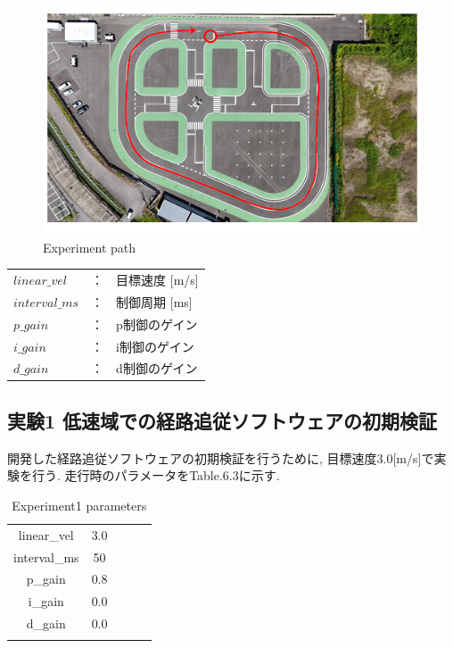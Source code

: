 \begin{figure}[H]
  \centering
 \includegraphics[keepaspectratio, scale=0.6]
      {images/AIFormulapath.png}
 \caption{Experiment path}
 \label{fig:path}
\end{figure}

\begin{table}[H]
     \centering
     \begin{tabular}{lcl}
         $linear\_vel$ & ： & 目標速度 [m/s] \\
         $interval\_ms$ & ： & 制御周期 [ms] \\
         $p\_gain$ & ： & p制御のゲイン\\
         $i\_gain$ & ： & i制御のゲイン\\
         $d\_gain$ & ： & d制御のゲイン\\
     \end{tabular}
\end{table}

\subsection{実験1  低速域での経路追従ソフトウェアの初期検証}
開発した経路追従ソフトウェアの初期検証を行うために, 目標速度3.0[m/s]で実験を行う.
走行時のパラメータをTable.6.3に示す.
\begin{table}[H]
     \centering
     \caption{Experiment1 parameters}
     \begin{tabular}{cclll}
     \multicolumn{1}{c|}{linear\_vel}     & 3.0  &  &  &  \\
     \multicolumn{1}{c|}{interval\_ms}    & 50   &  &  &  \\
     \multicolumn{1}{c|}{p\_gain}          & 0.8  &  &  &  \\
     \multicolumn{1}{c|}{i\_gain}          & 0.0  &  &  &  \\
     \multicolumn{1}{c|}{d\_gain}          & 0.0 &  &  &  \\
     \multicolumn{1}{l}{}                 &      &  &  &  \\
     \end{tabular}
\end{table}

